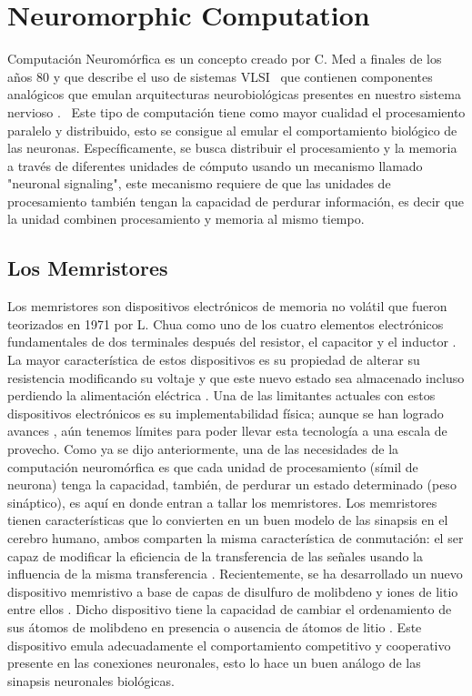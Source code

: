 \documentclass[conference]{IEEEtran}
\begin{document}
\section{Neuromorphic Computation}
Computación Neuromórfica es un concepto creado por C. Med a finales de los años 80 \cite{chen2018neuromorphic} y que describe el uso de sistemas VLSI  que contienen componentes analógicos que emulan arquitecturas neurobiológicas presentes en nuestro sistema nervioso \cite{chen2018neuromorphic}. 
Este tipo de computación tiene como mayor cualidad el procesamiento paralelo y distribuido, esto se consigue al emular el comportamiento biológico de las neuronas. Específicamente, se busca distribuir el procesamiento y la memoria a través de diferentes unidades de cómputo usando un mecanismo llamado "neuronal signaling", este mecanismo requiere de que las unidades de procesamiento también tengan la capacidad de perdurar información, es decir que la unidad combinen procesamiento y memoria al mismo tiempo. 

\subsection{Los Memristores}
Los memristores son dispositivos electrónicos de memoria no volátil que fueron teorizados en 1971 por L. Chua como uno de los cuatro elementos electrónicos fundamentales de dos terminales después del resistor, el capacitor y el inductor \cite{chua1984nonlinear}. La mayor característica de estos dispositivos es su propiedad de alterar su resistencia modificando su voltaje y que este nuevo estado sea almacenado incluso perdiendo la alimentación eléctrica \cite{upadhyay2019emerging} \cite{jeong2016memristors}. Una de las limitantes actuales con estos dispositivos electrónicos es su implementabilidad física; aunque se han logrado avances \cite{jeong2016memristors}, aún tenemos límites para poder llevar esta tecnología a una escala de provecho.
Como ya se dijo anteriormente, una de las necesidades de la computación neuromórfica es que cada unidad de procesamiento (símil de neurona) tenga la capacidad, también, de perdurar un estado determinado (peso sináptico), es aquí en donde entran a tallar los memristores. Los memristores tienen características que lo convierten en un buen modelo de las sinapsis en el cerebro humano, ambos comparten la misma característica de conmutación: el ser capaz de modificar la eficiencia de la transferencia de las señales usando la influencia de la misma transferencia \cite{jeong2016memristors}\cite{sung2018perspective}. Recientemente, se ha desarrollado un nuevo dispositivo memristivo a base de capas de disulfuro de molibdeno y iones de litio entre ellos \cite{zhulilianglu2018ionic}. Dicho dispositivo tiene la capacidad de cambiar el ordenamiento de sus átomos de molibdeno en presencia o ausencia de átomos de litio \cite{zhulilianglu2018ionic}. Este dispositivo emula adecuadamente el comportamiento competitivo y cooperativo presente en las conexiones neuronales, esto lo hace un buen análogo de las sinapsis neuronales biológicas.
\end{document}
